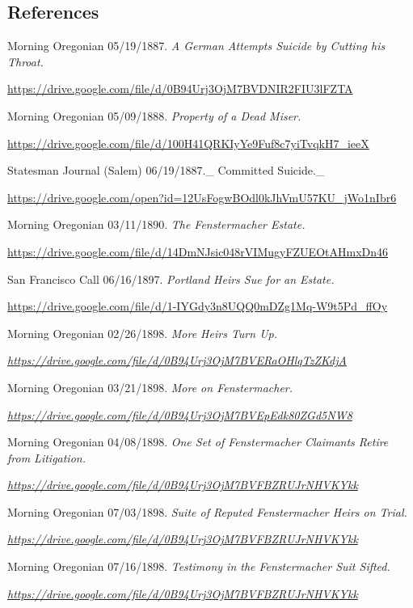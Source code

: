 \documentclass[
  12pt,
]{book}
\begin{document}
\hypertarget{references-7}{%
\subsection{References}\label{references-7}}

Morning Oregonian 05/19/1887. \emph{A German Attempts Suicide by Cutting his Throat.}

\href{https://drive.google.com/file/d/0B94Urj3OjM7BVDNIR2FIU3lFZTA/view}{https://drive.google.com/file/d/0B94Urj3OjM7BVDNIR2FIU3lFZTA}

Morning Oregonian 05/09/1888. \emph{Property of a Dead Miser.}

\href{https://drive.google.com/file/d/100H41QRKIyYe9Fuf8c7yiTvqkH7_ieeX/view}{https://drive.google.com/file/d/100H41QRKIyYe9Fuf8c7yiTvqkH7\_ieeX}

Statesman Journal (Salem) 06/19/1887.\_ Committed Suicide.\_

\url{https://drive.google.com/open?id=12UsFogwBOdl0kJhVmU57KU_jWo1nIbr6}

Morning Oregonian 03/11/1890. \emph{The Fenstermacher Estate.}

\url{https://drive.google.com/file/d/14DmNJsic048rVIMugyFZUEOtAHmxDn46}

San Francisco Call 06/16/1897. \emph{Portland Heirs Sue for an Estate.}

\url{https://drive.google.com/file/d/1-IYGdy3n8UQQ0mDZg1Mq-W9t5Pd_ffOy}

Morning Oregonian 02/26/1898. \emph{More Heirs Turn Up.}

\emph{\url{https://drive.google.com/file/d/0B94Urj3OjM7BVERaOHlqTzZKdjA}}

Morning Oregonian 03/21/1898. \emph{More on Fenstermacher.}

\emph{\url{https://drive.google.com/file/d/0B94Urj3OjM7BVEpEdk80ZGd5NW8}}

Morning Oregonian 04/08/1898. \emph{One Set of Fenstermacher Claimants Retire from Litigation.}

\emph{\url{https://drive.google.com/file/d/0B94Urj3OjM7BVFBZRUJrNHVKYkk}}

Morning Oregonian 07/03/1898. \emph{Suite of Reputed Fenstermacher Heirs on Trial.}

\emph{\url{https://drive.google.com/file/d/0B94Urj3OjM7BVFBZRUJrNHVKYkk}}

Morning Oregonian 07/16/1898. \emph{Testimony in the Fenstermacher Suit Sifted.}

\emph{\url{https://drive.google.com/file/d/0B94Urj3OjM7BVFBZRUJrNHVKYkk}}
\end{document}
